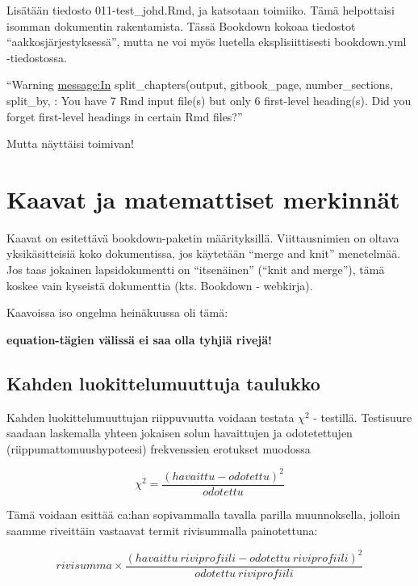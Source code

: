 \documentclass[finnish,]{book}
\begin{document}
Lisätään tiedosto 011-test\_johd.Rmd, ja katsotaan toimiiko. Tämä helpottaisi
isomman dokumentin rakentamista. Tässä Bookdown kokoaa tiedostot ``aakkosjärjestyksessä'',
mutta ne voi myös luetella eksplisiittisesti bookdown.yml -tiedostossa.

``Warning \url{message:In} split\_chapters(output, gitbook\_page, number\_sections, split\_by, :
You have 7 Rmd input file(s) but only 6 first-level heading(s). Did you forget first-level headings in certain Rmd files?''

Mutta näyttäisi toimivan!

\hypertarget{kaavat-ja-matemattiset-merkinnat}{%
\chapter{Kaavat ja matemattiset merkinnät}\label{kaavat-ja-matemattiset-merkinnat}}

Kaavat on esitettävä bookdown-paketin määrityksillä. Viittausnimien on oltava yksikäsitteisiä koko dokumentissa, jos käytetään ``merge and knit'' menetelmää. Jos taas jokainen lapsidokumentti on ``itsenäinen'' (``knit and merge''), tämä koskee vain kyseistä dokumenttia (kts. Bookdown - webkirja).

Kaavoissa iso ongelma heinäkuussa oli tämä:

\textbf{equation-tägien välissä ei saa olla tyhjiä rivejä!}

\hypertarget{kahden-luokittelumuuttuja-taulukko}{%
\section{Kahden luokittelumuuttuja taulukko}\label{kahden-luokittelumuuttuja-taulukko}}

Kahden luokittelumuuttujan riippuvuutta voidaan testata \(\chi^{2}\) - testillä. Testisuure saadaan laskemalla yhteen jokaisen solun havaittujen ja odotetettujen (riippumattomuushypoteesi) frekvenssien erotukset muodossa

\begin{equation}
  \chi^{2} = \frac{(havaittu - odotettu)^2} {odotettu}
  \label{eq:khii21}
\end{equation}

Tämä voidaan esittää ca:han sopivammalla tavalla parilla muunnoksella, jolloin saamme riveittäin vastaavat termit rivisummalla painotettuna:

\begin{equation}
  rivisumma \times \frac{(havaittu \: riviprofiili - odotettu \: riviprofiili)^2} {odotettu \: riviprofiili}
  \label{eq:khii22}
\end{equation}
\end{document}

